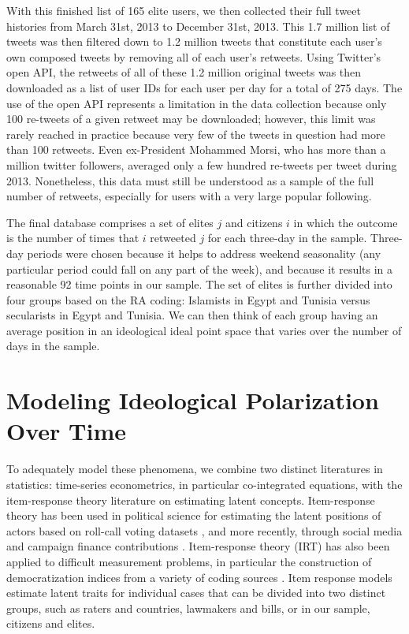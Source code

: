\documentclass[12pt]{article}
\begin{document}
With this finished list of 165 elite users, we then collected their full tweet histories from March 31st, 2013 to December 31st, 2013. This 1.7 million list of tweets was then filtered down to 1.2 million tweets that constitute each user's own composed tweets by removing all of each user's retweets. Using Twitter's open API, the retweets of all of these 1.2 million original tweets was then downloaded as a list of user IDs for each user per day for a total of 275 days. The use of the open API represents a limitation in the data collection because only 100 re-tweets of a given retweet may be downloaded; however, this limit was rarely reached in practice because very few of the tweets in question had more than 100 retweets. Even ex-President Mohammed Morsi, who has more than a million twitter followers, averaged only a few hundred re-tweets per tweet during 2013. Nonetheless, this data must still be understood as a sample of the full number of retweets, especially for users with a very large popular following.

The final database comprises a set of elites $j$ and citizens $i$ in which the outcome is the number of times that $i$ retweeted $j$ for each three-day in the sample. Three-day periods were chosen because it helps to address weekend seasonality (any particular period could fall on any part of the week), and because it results in a reasonable 92 time points in our sample. The set of elites is further divided into four groups based on the RA coding: Islamists in Egypt and Tunisia versus secularists in Egypt and Tunisia. We can then think of each group having an average position in an ideological ideal point space that varies over the number of days in the sample. 

\section*{Modeling Ideological Polarization Over Time}
To adequately model these phenomena, we combine two distinct literatures in statistics: time-series econometrics, in particular co-integrated equations, with the item-response theory literature on estimating latent concepts. Item-response theory has been used in political science for estimating the latent positions of actors based on roll-call voting datasets \parencite{jackman2004}, and more recently, through social media and campaign finance contributions \parencite{bonica2014,barbera2015}. Item-response theory (IRT) has also been applied to difficult measurement problems, in particular the construction of democratization indices from a variety of coding sources \parencite{vdem2017,treier2008}. Item response models estimate latent traits for individual cases that can be divided into two distinct groups, such as raters and countries, lawmakers and bills, or in our sample, citizens and elites. 
\end{document}
